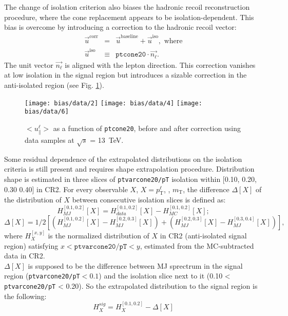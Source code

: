  The change of isolation criterion also biases the hadronic recoil reconstruction procedure, where the cone replacement appears to be isolation-dependent. This bias is overcome by introducing a correction to the hadronic recoil vector:
 \begin{eqnarray}
 \vec{u}^\text{corr} &=& \vec{u}^\text{baseline} + \vec{u}^\text{iso}, \text{ where}\\
 \vec{u}^\text{iso} &\equiv& \texttt{ptcone20} \cdot \vec{n_\ell}.
 \end{eqnarray}
 The unit vector $\vec{n_\ell}$ is aligned with the lepton direction. This correction vanishes at low isolation in the signal region but introduces a sizable correction in the anti-isolated region (see Fig. \ref{fig:calib_upar}).
 \begin{figure}
 	\centering
 	\texttt{[image: bias/data/2]}
 	\texttt{[image: bias/data/4]}
 	\texttt{[image: bias/data/6]}
 	\caption{$<u_\parallel^\ell>$ as a function of \texttt{ptcone20}, before and after correction using data samples at $\sqrt{s}$ = 13~TeV.}
 	\label{fig:calib_upar}
 \end{figure}
Some residual dependence of the extrapolated distributions on the isolation criteria is still present and requires shape extrapolation procedure. Distribution shape is estimated in three slices of \texttt{ptvarcone20/pT} isolation within [0.10, 0.20, 0.30 0.40] in CR2. For every observable $X$, $X = p_\text{T}^\ell$, \met, $m_\text{T}$, the difference $\Delta[X]$ of the distribution of $X$ between consecutive isolation slices is defined as:
\begin{equation}
H_{MJ}^{[0.1,0.2]}[X] = H_{data}^{[0.1,0.2]}[X] - H_{MC}^{[0.1,0.2]}[X]; 
\end{equation}
\begin{equation}
\Delta[X]= 1/2 \left[ (H_{MJ}^{[0.1,0.2]}[X]-H_{MJ}^{[0.2,0.3]}[X]) + (H_{MJ}^{[0.2,0.3]}[X]-H_{MJ}^{[0.3,0.4]}[X]) \right],
\end{equation}
where $H_{X}^{[x,y]}$ is the normalized distribution of $X$ in CR2 (anti-isolated signal region) satisfying $x < \texttt{ptvarcone20/pT} < y$, estimated from the MC-subtracted data in CR2.\\
$\Delta[X]$ is supposed to be the difference between MJ sprectrum in the signal region (\texttt{ptvarcone20/pT}$<0.1$)  and the isolation slice next to it (0.10 < \texttt{ptvarcone20/pT} < 0.20).
So the extrapolated distribution to the signal region is the following:
\begin{equation}
H_{X}^{sig} = H_{X}^{[0.1,0.2]} - \Delta[X]
\end{equation}
